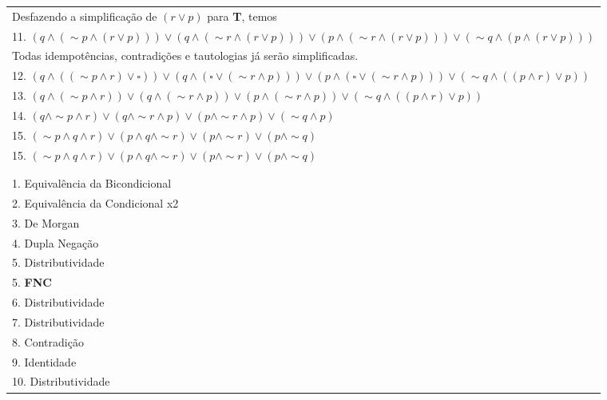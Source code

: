 \documentclass[12pt, a4paper,final]{article}
\begin{document}
\begin{enumerate}
\begin{enumerate}[label=(\alph*), leftmargin = 5mm]
\begin{tabular}{l}
                    Desfazendo a simplificação de $(r \vee p)$ para \textbf{T}, temos\\
                    11. $(q \wedge (\sim p \wedge (r \vee p))) \vee (q \wedge (\sim r \wedge (r \vee p))) \vee (p \wedge (\sim r \wedge (r \vee p))) \vee (\sim q \wedge (p \wedge (r \vee p)))$\\
                    Todas idempotências, contradições e tautologias já serão simplificadas.\\
                    12. $(q \wedge ((\sim p \wedge r) \vee \square)) \vee (q \wedge (\square \vee (\sim r \wedge p))) \vee (p \wedge (\square \vee (\sim r \wedge p))) \vee (\sim q \wedge ((p \wedge r) \vee p))$\\ %
                    13. $(q \wedge (\sim p \wedge r)) \vee (q \wedge (\sim r \wedge p)) \vee (p \wedge (\sim r \wedge p)) \vee (\sim q \wedge ((p \wedge r) \vee p))$ \\ %
                    14. $(q \wedge \sim p \wedge r) \vee (q \wedge \sim r \wedge p) \vee (p \wedge \sim r \wedge p) \vee (\sim q \wedge p)$ \\ %
                    15. $(\sim p \wedge q \wedge r) \vee (p \wedge q \wedge \sim r) \vee (p \wedge \sim r) \vee (p \wedge \sim q)$ \\ %
                    15. $(\sim p \wedge q \wedge r) \vee (p \wedge q \wedge \sim r) \vee (p \wedge \sim r) \vee (p \wedge \sim q)$ \\ %
                    \\
                    \\                            
                    1. Equivalência da Bicondicional \\
                    2. Equivalência da Condicional x2 \\
                    3. De Morgan \\
                    4. Dupla Negação \\
                    5. Distributividade \\
                    5. \textbf{FNC} \\
                    6. Distributividade \\
                    7. Distributividade \\
                    8. Contradição \\
                    9. Identidade \\
                    10. Distributividade \\

\end{tabular}
\end{enumerate}
\end{enumerate}
\end{document}
